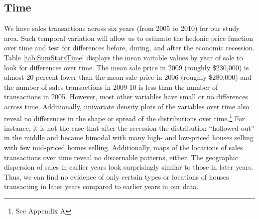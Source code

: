 \documentclass{article}\usepackage{graphicx, color}
\begin{document}
\subsection{Time}
We have sales transactions across six years (from 2005 to 2010) for our study area. Such temporal variation will allow us to estimate the hedonic price function over time and test for differences before, during, and after the economic recession. Table \ref{tab:SumStatsTime} displays the mean variable values by year of sale to look for differences over time. The mean sale price in 2009 (roughly \$230,000) is almost 20 percent lower than the mean sale price in 2006 (roughly \$280,000) and the number of sales transactions in 2009-10 is less than the number of transactions in 2005. However, most other variables have small or no differences across time. Additionally, univariate density plots of the variables over time also reveal no differences in the shape or spread of the distributions over time.\footnote{See Appendix A} For instance, it is not the case that after the recession the distribution ``hollowed out'' in the middle and became bimodal with many high- and low-priced houses selling with few mid-priced homes selling. Additionally, maps of the locations of sales transactions over time reveal no discernable patterns, either. The geographic dispersion of sales in earlier years look surprisingly similar to those in later years. Thus, we can find no evidence of only certain types or locations of houses transacting in later years compared to earlier years in our data.
\end{document}
